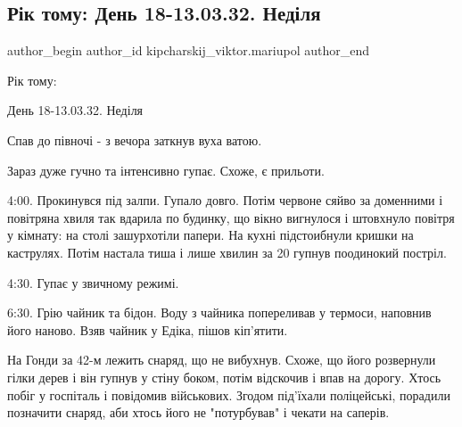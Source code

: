  
 
 
 
 

\subsection{Рік тому:  День 18-13.03.32.  Неділя}
\label{sec:13_03_2023.fb.kipcharskij_viktor.mariupol.1.r_k_tomu___den_18_13}

\ifcmt
 author_begin
   author_id kipcharskij_viktor.mariupol
 author_end
\fi

Рік тому: 

День 18-13.03.32.  Неділя

Спав до півночі - з вечора заткнув вуха ватою.

Зараз дуже гучно та інтенсивно гупає. Схоже, є прильоти.


4:00. Прокинувся під залпи. Гупало довго. Потім червоне сяйво за доменними і
повітряна хвиля так вдарила по будинку, що вікно вигнулося і штовхнуло повітря
у кімнату: на столі зашурхотіли папери. На кухні підстоибнули кришки на
каструлях. Потім настала тиша і лише хвилин за 20 гупнув поодинокий постріл.

4:30. Гупає у звичному режимі.

6:30. Грію чайник та бідон. Воду з чайника попереливав у термоси, наповнив його
наново. Взяв чайник у Едіка, пішов кіп'ятити.

На Гонди за 42-м лежить снаряд, що не вибухнув. Схоже, що його розвернули гілки
дерев і він гупнув у стіну боком, потім відскочив і впав на дорогу. Хтось побіг
у госпіталь і повідомив військових. Згодом під'їхали поліцейські, порадили
позначити снаряд, аби хтось його не "потурбував" і чекати на саперів.

